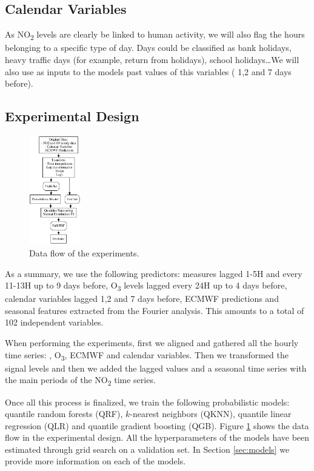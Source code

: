 \documentclass[a4paper,3p,sort&compress]{elsarticle}
\begin{document}
\subsection{Calendar Variables}
\label{sec:cal_data}

As NO\textsubscript{2} levels are clearly be linked to human activity,
we will also flag the hours belonging to a specific type of day. Days
could be classified as bank holidays, heavy traffic days (for example,
return from holidays), school holidays\ldots We will also use as
inputs to the models past values of this variables ( 1,2 and 7 days
before).

\subsection{Experimental Design}
\label{sec:experimental-design}

\begin{figure}
  \centering
  \includegraphics[width=0.2\textwidth]{diagrams/flow}
  \caption{\label{figure:dataflow}Data flow of the
    experiments.}
\end{figure}

As a summary, we use the following predictors: \no
measures lagged 1-5H and every 11-13H up to 9 days before,
O\textsubscript{3} levels lagged every 24H up to 4 days before, 
calendar variables lagged 1,2 and 7 days before,
 ECMWF predictions and seasonal features extracted
from the Fourier analysis. This amounts to a total of 102 independent
variables. 

When performing the experiments, first we aligned and gathered all the
hourly time series: \no, O\textsubscript{3}, ECMWF and
calendar variables.  Then we transformed the signal levels and then we
added the lagged values and a seasonal time series with the main
periods of the NO\textsubscript{2} time series.

Once all this process is finalized, we train the following
probabilistic models: quantile random forests (QRF), $k$-nearest
neighbors (QKNN), quantile linear regression (QLR) and quantile
gradient boosting (QGB).  Figure \ref{figure:dataflow} shows the data
flow in the experimental design. All the hyperparameters of the models
have been estimated through grid search on a validation set.  
In Section \ref{sec:models}
we provide more information on each of the models.
\end{document}
